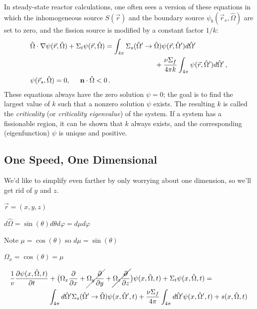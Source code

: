 \documentclass[12pt]{article}
\newcommand{\rvec}{\ensuremath{\vec{r}}}
\newcommand{\omvec}{\ensuremath{\hat{\Omega}}}
\newcommand{\vOmega}{\ensuremath{\hat{\Omega}}}
\begin{document}
In steady-state reactor calculations, one often sees a version of these equations in which the inhomogeneous source $S(\rvec)$ and the boundary source $\psi_b(\rvec_s,\omvec)$ are set to zero, and the fission source is modified by a constant factor $1/k$:
\begin{align*}
&\omvec\cdot  \nabla \psi(\rvec,\omvec) +
 \Sigma_t\psi(\rvec,\omvec)%
 =
\int_{4\pi}\Sigma_s(\omvec'\rightarrow\omvec)
\psi(\rvec,\omvec')d\omvec'\\&\quad\quad\quad\quad\quad\quad\quad\quad\quad\quad\quad\quad\quad\quad\quad\quad\quad\quad
 +\frac{\nu\Sigma_f}{4\pi k}\int_{4\pi}
\psi(\rvec,\omvec')d\omvec'\,,\nonumber\\
&\psi(\rvec_s,\omvec) = 0, \hspace{0.5 cm} \textbf{n} \cdot \omvec <0\,.
\end{align*}
These equations always have the zero solution $\psi = 0$; the goal is to find the largest value of $k$ such that a nonzero solution $\psi$ exists. The resulting $k$ is called the \textit{criticality} (or \textit{criticality eigenvalue}) of the system. If a system has a fissionable region, it can be shown that $k$ always exists, and the corresponding (eigenfunction) $\psi$ is unique and positive.


\subsection*{One Speed, One Dimensional}

We'd like to simplify even farther by only worrying about one dimension, so we'll get rid of $y$ and $z$.

$\vec{r} = (x, y, z)$

$d\vOmega = \sin(\theta) d\theta	d\varphi = d\mu d\varphi$

Note $\mu = \cos(\theta)$ so $d\mu = \sin(\theta)$

$\Omega_x = \cos(\theta) = \mu$

\begin{align*}
\frac{1}{v}\frac{\partial \psi(x, \vOmega, t)}{\partial t} &+ 
\bigl(\Omega_x \frac{\partial}{\partial x} + \cancel{\Omega_y \frac{\partial}{\partial y}} + \cancel{\Omega_z \frac{\partial}{\partial z}} \bigr)\psi(x, \vOmega, t) +
\Sigma_t \psi(x, \vOmega, t) = \nonumber\\
%
& \int_{4\pi} d\vOmega' \Sigma_s(\vOmega' \rightarrow \vOmega) \psi(x, \vOmega', t)  + 
\frac{\nu \Sigma_f}{4\pi} \int_{4\pi} d\vOmega' \psi(x,  \vOmega', t) + s(x, \vOmega, t)%
\end{align*}

\end{document}
